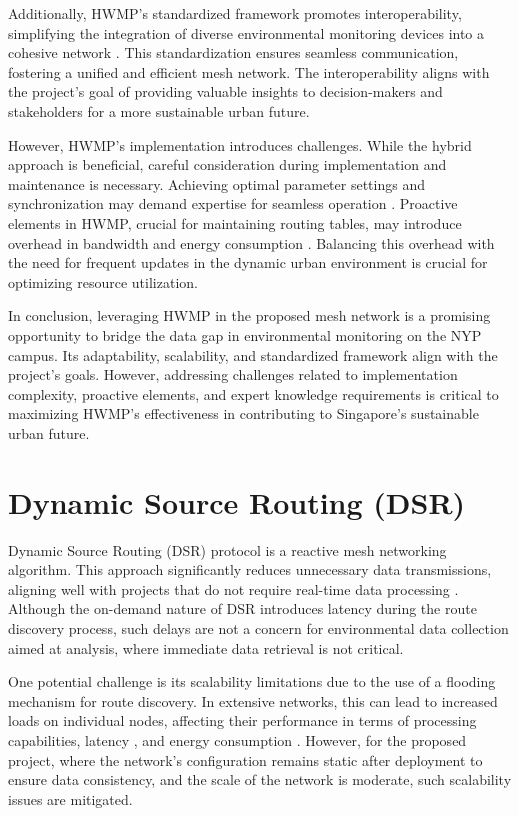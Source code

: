 Additionally, HWMP's standardized framework promotes interoperability, simplifying the integration of diverse environmental monitoring devices into a cohesive network \cite{Whye_Lee_Lam_Yoo_2013}. This standardization ensures seamless communication, fostering a unified and efficient mesh network. The interoperability aligns with the project's goal of providing valuable insights to decision-makers and stakeholders for a more sustainable urban future. 

However, HWMP's implementation introduces challenges. While the hybrid approach is beneficial, careful consideration during implementation and maintenance is necessary. Achieving optimal parameter settings and synchronization may demand expertise for seamless operation \cite{Mishra_Kumar_Raghuvanshi_2023}. Proactive elements in HWMP, crucial for maintaining routing tables, may introduce overhead in bandwidth and energy consumption \cite{nmk2013}. Balancing this overhead with the need for frequent updates in the dynamic urban environment is crucial for optimizing resource utilization.

In conclusion, leveraging HWMP in the proposed mesh network is a promising opportunity to bridge the data gap in environmental monitoring on the NYP campus. Its adaptability, scalability, and standardized framework align with the project's goals. However, addressing challenges related to implementation complexity, proactive elements, and expert knowledge requirements is critical to maximizing HWMP's effectiveness in contributing to Singapore's sustainable urban future.

\section{Dynamic Source Routing (DSR)}\label{sec:lr_dsr}
Dynamic Source Routing (DSR) protocol is a reactive mesh networking algorithm. This approach significantly reduces unnecessary data transmissions, aligning well with projects that do not require real-time data processing \cite{5431521}. Although the on-demand nature of DSR introduces latency during the route discovery process, such delays are not a concern for environmental data collection aimed at analysis, where immediate data retrieval is not critical.

One potential challenge is its scalability limitations due to the use of a flooding mechanism for route discovery. In extensive networks, this can lead to increased loads on individual nodes, affecting their performance in terms of processing capabilities, latency \cite{6488843}, and energy consumption \cite{energy,1431308}. However, for the proposed project, where the network's configuration remains static after deployment to ensure data consistency, and the scale of the network is moderate, such scalability issues are mitigated.

